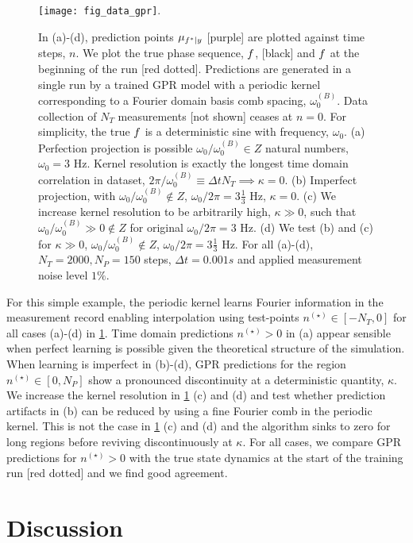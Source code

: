 \begin{figure}
    \texttt{[image: fig\_data\_gpr]}. 
    \caption{\label{fig:main:fig_data_gpr} In (a)-(d), prediction points $\mu_{f^*|y}$ [purple] are plotted against time steps, $n$. We plot the true phase sequence,  $f$, [black] and  $f$ at the beginning of the run [red dotted]. Predictions are generated in a single run by a trained GPR model with a periodic kernel corresponding to a Fourier domain basis comb spacing, $\omega_0^{(B)}$. Data collection of $N_T$ measurements [not shown] ceases at $n=0$. For simplicity, the true $f$ is a deterministic sine with frequency, $\omega_0$. (a) Perfection projection is possible $\omega_0 / \omega_0^{(B)} \in Z$ natural numbers, $\omega_0 = 3$ Hz. Kernel resolution is exactly the longest time domain correlation in dataset, $2 \pi / \omega_0^{(B)} \equiv \Delta t N_T \implies \kappa = 0$.   (b) Imperfect projection, with $\omega_0 / \omega_0^{(B)} \notin Z$, $\omega_0 / 2 \pi = 3 \frac{1}{3}$ Hz, $\kappa=0$. (c) We increase kernel resolution to be arbitrarily high, $\kappa \gg 0 $, such that $\omega_0 / \omega_0^{(B)} \gg 0 \notin Z $ for original $ \omega_0 / 2 \pi = 3$ Hz. (d) We test (b) and (c) for $\kappa \gg0$, $ \omega_0 / \omega_0^{(B)} \notin Z$, $\omega_0 / 2 \pi = 3 \frac{1}{3}$ Hz. For all (a)-(d), $N_T = 2000, N_P = 150$ steps, $\Delta t = 0.001s$ and applied measurement noise level $1\%$.} 
\end{figure}
For this simple example, the periodic kernel learns Fourier information in the measurement record enabling interpolation using test-points $n^{(\star)} \in [-N_T, 0]$ for all cases (a)-(d) in \cref{fig:main:fig_data_gpr}. Time domain predictions $n^{(\star)} >0$  in (a) appear sensible when perfect learning is possible given the theoretical structure of the simulation. When learning is imperfect in (b)-(d), GPR predictions for the region  $n^{(\star)} \in [0, N_P]$ show a pronounced discontinuity at a deterministic quantity, $\kappa$.  We increase the kernel resolution in \cref{fig:main:fig_data_gpr} (c) and (d) and test whether prediction artifacts in (b) can be reduced by using a fine Fourier comb in the periodic kernel. This is not the case in \cref{fig:main:fig_data_gpr} (c) and (d) and the algorithm sinks to zero for long regions before reviving discontinuously at $\kappa$. For all cases, we compare GPR predictions for $n^{(\star)}>0$ with the true state dynamics at the start of the training run [red dotted] and we find good agreement. 

\section{Discussion} \label{sec:main:discussion}


